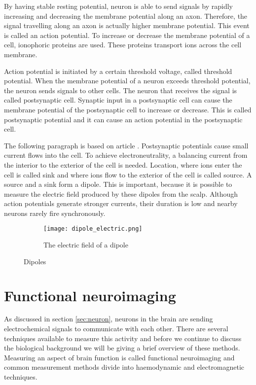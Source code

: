 By having stable resting potential, neuron is able to send signals by rapidly increasing and decreasing the membrane potential along an axon. Therefore, the signal travelling along an axon is actually higher membrane potential. This event is called an action potential. To increase or decrease the membrane potential of a cell, ionophoric proteins are used. These proteins transport ions across the cell membrane.

Action potential is initiated by a certain threshold voltage, called threshold potential. When the membrane potential of a neuron exceeds threshold potential, the neuron sends signals to other cells. The neuron that receives the signal is called postsynaptic cell. Synaptic input in a postsynaptic cell can cause the membrane potential of the postsynaptic cell to increase or decrease. This is called postsynaptic potential and it can cause an action potential in the postsynaptic cell.

The following paragraph is based on article \cite{electric_field}. Postsynaptic potentials cause small current flows into the cell. To achieve electroneutrality, a balancing current from the interior to the exterior of the cell is needed. Location, where ions enter the cell is called sink and where ions flow to the exterior of the cell is called source. A source and a sink form a dipole. This is important, because it is possible to measure the electric field produced by these dipoles from the scalp. Although action potentials generate stronger currents, their duration is low and nearby neurons rarely fire synchronously.

\begin{figure}[b!]
	\centering
	\begin{subfigure}{0.48\textwidth}
		\texttt{[image: dipole\_electric.png]}
		\caption{The electric field of a dipole} %
		\label{fig:dipole_electric}
	\end{subfigure}
	\caption{Dipoles}
	\label{fig:dipole}
\end{figure}

\section{Functional neuroimaging}
\label{sec:neuroimaging}

As discussed in section \ref{sec:neuron}, neurons in the brain are sending electrochemical signals to communicate with each other. There are several techniques available to measure this activity and before we continue to discuss the biological background we will be giving a brief overview of these methods. Measuring an aspect of brain function is called functional neuroimaging and common measurement methods divide into haemodynamic and electromagnetic techniques.

